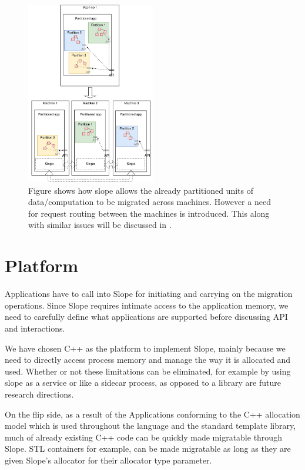 \begin{figure}[H]
\centering

\includegraphics[width=0.5\textwidth]{design-goals-pluggable.drawio}
\caption{
    Figure shows how slope allows the already partitioned units of
    data/computation to be migrated across machines. However a need for request
    routing between the machines is introduced. This along with similar issues
    will be discussed in .
}
\label{fig:designgoalspluggable}
\end{figure}

\section{Platform}
Applications have to call into Slope for initiating and carrying on the
migration operations. Since Slope requires intimate access to the application
memory, we need to carefully define what applications are supported
before discussing API and interactions.

We have chosen C++ as the platform to implement Slope, mainly because we need
to directly access process memory and manage the way it is allocated and used.
Whether or not these limitations can be eliminated, for example by using slope
as a service or like a sidecar process, as opposed to a library are future
research directions.

On the flip side, as a result of the Applications conforming to the C++
allocation model which is used throughout the language and the standard
template library, much of already existing C++ code can be quickly made
migratable through Slope. STL containers for example, can be made migratable as long as they are given Slope's allocator for their allocator type parameter.

